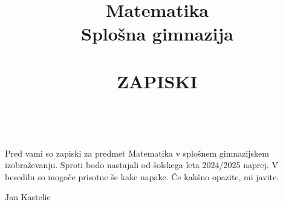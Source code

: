 \documentclass[11pt,a4paper]{book}
\author{}
\title{\Huge{Matematika \\ Splošna gimnazija} \\ ~\\\Large{ZAPISKI}}
\begin{document}
\frontmatter
\maketitle

\newpage
\thispagestyle{empty}
~

\newpage

\mbox{}
\vfill
Pred vami so zapiski za predmet Matematika v splošnem gimnazijskem izobraževanju. 
Sproti bodo nastajali od šolskega leta 2024/2025 naprej.
V besedilu so mogoče prisotne še kake napake. Če kakšno opazite, mi javite.
\bigskip
\begin{flushright}
  Jan Kastelic  \qquad \qquad\qquad\qquad\hbox{} \\
\end{flushright}

\newpage
\thispagestyle{empty}
~

\tableofcontents

\newpage
\thispagestyle{empty}
~

\mainmatter













\end{document}
